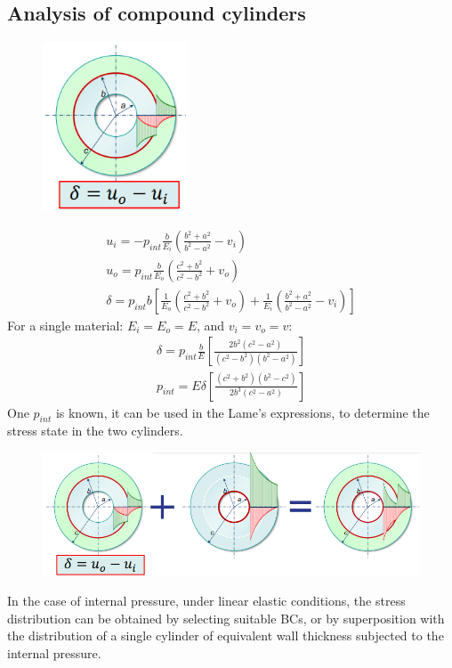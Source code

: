 \documentclass[class=report, crop=false, 12pt,a4paper]{standalone}
\begin{document}
\subsection{Analysis of compound cylinders}
\begin{figure}[H]
    \centering
    \includegraphics[height = 5cm]{../img/diagram125.png}
    \caption{}
\end{figure}
\begin{gather}
    u_i =-p_{int}\frac{b}{E_i}\left(\frac{b^2 + a^2 }{b^2 - a^2}-v_i\right)\\
    u_o = p_{int}\frac{b}{E_o}\left(\frac{c^2 + b^2 }{c^2 - b^2}+v_o\right)\\
    \delta = p_{int}b\left[\frac{1}{E_o}\left(\frac{c^2 + b^2}{c^2 - b^2}+v_o\right) + \frac{1}{E_i}\left(\frac{b^2 + a^2}{b^2 - a^2}-v_i\right)\right]
\end{gather}
For a single material: $E_i = E_o = E$, and $v_i = v_o = v$:
\begin{gather}
    \delta = p_{int} \frac{b}{E}\left[\frac{2b^2\left(c^2-a^2\right)}{\left(c^2 - b^2\right)\left(b^2-a^2\right)}\right]\\
    p_{int} = E \delta \left[\frac{\left(c^2 + b^2\right)\left(b^2 - c^2\right)}{2b^3\left(c^2 - a^2\right)}\right]
\end{gather}
One $p_{int}$ is known, it can be used in the Lame's expressions, to determine the stress state in the two cylinders. 
\begin{figure}[H]
    \centering
    \includegraphics[width = \textwidth]{../img/diagram126.png}
    \caption{}
\end{figure}
In the case of internal pressure, under linear elastic conditions, the stress distribution can be obtained by selecting suitable BCs, or by superposition with the distribution of a single cylinder of equivalent wall thickness subjected to the internal pressure.
\end{document}
